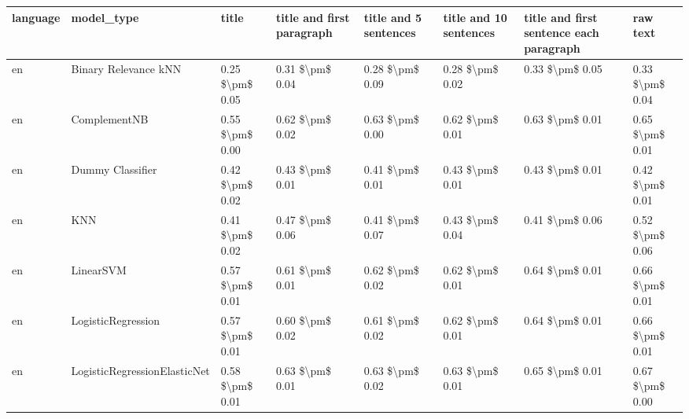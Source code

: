 \begin{tabular}{llllllll}
\toprule
language &                      model\_type &           title & title and first paragraph & title and 5 sentences & title and 10 sentences & title and first sentence each paragraph &            raw text \\
\midrule
      en &            Binary Relevance kNN & 0.25 \$\textbackslash pm\$ 0.05 &           0.31 \$\textbackslash pm\$ 0.04 &       0.28 \$\textbackslash pm\$ 0.09 &        0.28 \$\textbackslash pm\$ 0.02 &                         0.33 \$\textbackslash pm\$ 0.05 &     0.33 \$\textbackslash pm\$ 0.04 \\
      en &                    ComplementNB & 0.55 \$\textbackslash pm\$ 0.00 &           0.62 \$\textbackslash pm\$ 0.02 &       0.63 \$\textbackslash pm\$ 0.00 &        0.62 \$\textbackslash pm\$ 0.01 &                         0.63 \$\textbackslash pm\$ 0.01 &     0.65 \$\textbackslash pm\$ 0.01 \\
      en &                Dummy Classifier & 0.42 \$\textbackslash pm\$ 0.02 &           0.43 \$\textbackslash pm\$ 0.01 &       0.41 \$\textbackslash pm\$ 0.01 &        0.43 \$\textbackslash pm\$ 0.01 &                         0.43 \$\textbackslash pm\$ 0.01 &     0.42 \$\textbackslash pm\$ 0.01 \\
      en &                             KNN & 0.41 \$\textbackslash pm\$ 0.02 &           0.47 \$\textbackslash pm\$ 0.06 &       0.41 \$\textbackslash pm\$ 0.07 &        0.43 \$\textbackslash pm\$ 0.04 &                         0.41 \$\textbackslash pm\$ 0.06 &     0.52 \$\textbackslash pm\$ 0.06 \\
      en &                       LinearSVM & 0.57 \$\textbackslash pm\$ 0.01 &           0.61 \$\textbackslash pm\$ 0.01 &       0.62 \$\textbackslash pm\$ 0.02 &        0.62 \$\textbackslash pm\$ 0.01 &                         0.64 \$\textbackslash pm\$ 0.01 &     0.66 \$\textbackslash pm\$ 0.01 \\
      en &              LogisticRegression & 0.57 \$\textbackslash pm\$ 0.01 &           0.60 \$\textbackslash pm\$ 0.02 &       0.61 \$\textbackslash pm\$ 0.02 &        0.62 \$\textbackslash pm\$ 0.01 &                         0.64 \$\textbackslash pm\$ 0.01 &     0.66 \$\textbackslash pm\$ 0.01 \\
      en &    LogisticRegressionElasticNet & 0.58 \$\textbackslash pm\$ 0.01 &           0.63 \$\textbackslash pm\$ 0.01 &       0.63 \$\textbackslash pm\$ 0.02 &        0.63 \$\textbackslash pm\$ 0.01 &                         0.65 \$\textbackslash pm\$ 0.01 &     0.67 \$\textbackslash pm\$ 0.00 \\

\end{tabular}
